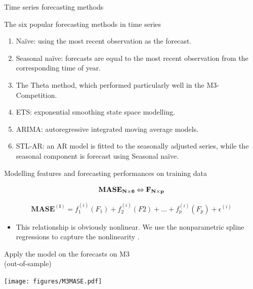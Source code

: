 \documentclass[11pt,ignorenonframetext,compress]{beamer}
\begin{document}
\begin{frame}{Time series forecasting methods}


  \begin{alertblock}{The six popular forecasting methods in time series}
    \begin{enumerate}
    \item Naïve: using the most recent observation as the forecast.
    \item Seasonal naïve: forecasts are equal to the most recent observation from the corresponding time of year.
    \item The Theta method, which performed particularly well in the M3-Competition.
    \item ETS: exponential smoothing state space modelling.
    \item ARIMA: autoregressive integrated moving average models.
    \item STL-AR: an AR model is fitted to the seasonally adjusted series, while the seasonal component is forecast using Seasonal naïve.
    \end{enumerate}
  \end{alertblock}

\end{frame}

\begin{frame}{Modelling features and forecasting performances on
    training data}

  \[\bf{MASE}_{N\times6} \Leftrightarrow \bf{F}_{N\times p}\]

  \[\mathbf{MASE^{(i)}} = f_1^{(i)}(F_1) + f_2^{(i)}(F2) + ... + f_p^{(i)}(F_p) + \epsilon^{(i)}\]
  \begin{itemize}
  \item This relationship is obviously nonlinear. We use the nonparametric spline regressions
    to capture the nonlinearity \citep{li2013efficient}.
  \end{itemize}

\end{frame}

\begin{frame}{Apply the model on the forecasts on M3 \\(out-of-sample)}

  \centerline{\texttt{[image: figures/M3MASE.pdf]}}

\end{frame}
\end{document}
